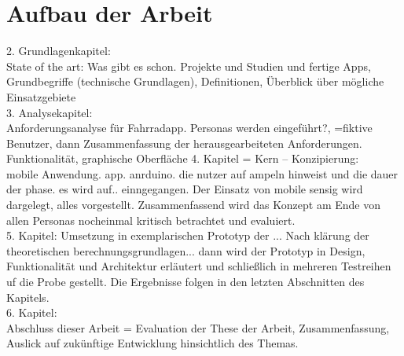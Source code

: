 \section{Aufbau der Arbeit}
2. Grundlagenkapitel:\\
State of the art: Was gibt es schon. Projekte und Studien und fertige Apps,\\ 
Grundbegriffe (technische Grundlagen), Definitionen, Überblick über mögliche Einsatzgebiete \\
3. Analysekapitel:\\
Anforderungsanalyse für Fahrradapp. Personas werden eingeführt?, =fiktive Benutzer, dann Zusammenfassung der herausgearbeiteten Anforderungen.\\
Funktionalität, graphische Oberfläche
4. Kapitel = Kern -- Konzipierung:\\
mobile Anwendung. app. anrduino. die nutzer auf ampeln hinweist und die dauer der phase. 
es wird auf.. einngegangen. Der Einsatz von mobile sensig wird dargelegt, alles vorgestellt. Zusammenfassend wird das Konzept am Ende von allen Personas nocheinmal kritisch betrachtet und evaluiert.\\
5. Kapitel: Umsetzung in exemplarischen Prototyp der ... Nach klärung der theoretischen berechnungsgrundlagen... dann wird der Prototyp in Design, Funktionalität und Architektur erläutert und schließlich in mehreren Testreihen uf die Probe gestellt. Die Ergebnisse folgen in den letzten Abschnitten des Kapitels.\\
6. Kapitel: \\
Abschluss dieser Arbeit = Evaluation der These der Arbeit, Zusammenfassung, Auslick auf zukünftige Entwicklung hinsichtlich des Themas.
